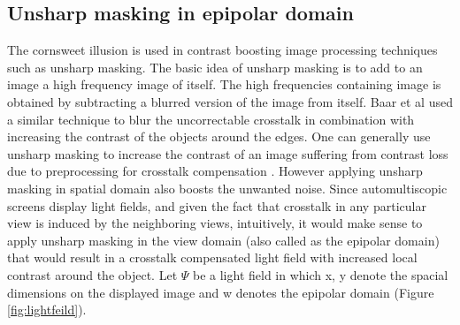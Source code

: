 \subsection{Unsharp masking in epipolar domain}
The cornsweet illusion \cite{ wiki:cornsweet} is used in contrast boosting image processing techniques such as unsharp masking. The basic idea of unsharp masking is to add to an image a high frequency image of itself. The high frequencies containing image is obtained by subtracting a blurred version of the image from itself. Baar et al\cite{van2011perceptually} used a similar technique to blur the uncorrectable crosstalk in combination with increasing the contrast of the objects around the edges. One can generally use unsharp masking to increase the contrast of an image suffering from contrast loss due to preprocessing for crosstalk compensation . However applying unsharp masking in spatial domain also boosts the unwanted noise. Since automultiscopic screens display light fields, and given the fact that crosstalk in any particular view is induced by the neighboring views, intuitively, it would make sense to apply unsharp masking in the view domain (also called as the epipolar domain) that would result in a crosstalk compensated light field with increased local contrast around the object. Let $\Psi$ be a light field in which x, y denote the spacial dimensions on the displayed image and w denotes the epipolar domain (Figure \ref{fig:lightfeild}).
